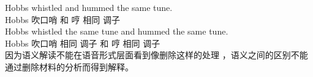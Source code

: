 \eal
\ex\label{ex-whistled-a} 
\gll Hobbs whistled and hummed the same tune.\\
Hobbs 吹口哨 和 哼  相同 调子\\
\ex\label{ex-whistled-b} 
\gll Hobbs whistled the same tune and hummed the same tune.\\
Hobbs 吹口哨  相同 调子 和 哼  相同 调子\\
\zl
因为语义解读不能在语音形式层面看到像删除这样的处理 \citep[\S~3]{Chomsky95a-u}，语义之间的区别不能通过删除材料的分析而得到解释。

